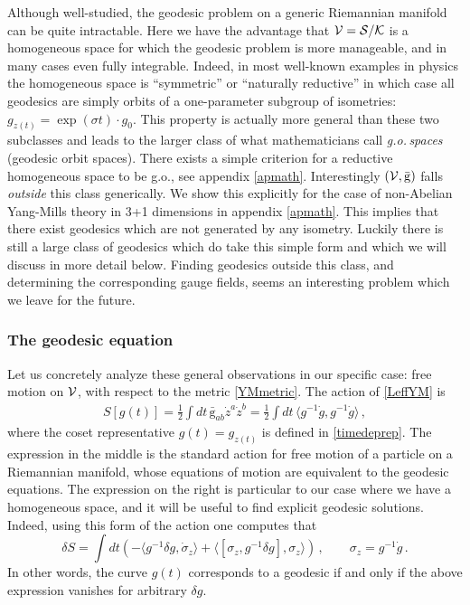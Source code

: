 \documentclass[11pt,a4paper]{article}
\def\calk{{\cal K}}
\def\cals{{\cal S}}
\def\calv{{\cal V}}
\def\rg{{\mathrm{g}}}
\begin{document}
    Although well-studied, the geodesic problem on a generic Riemannian manifold can be quite intractable. Here we have the advantage that $\calv=\cals/\calk$ is a homogeneous space for which the geodesic problem is more manageable, and in many cases even fully integrable. Indeed, in most well-known examples in physics the homogeneous space is ``symmetric'' or ``naturally reductive'' in which case all geodesics are simply orbits of a one-parameter subgroup of isometries: $g_{z(t)}=\exp(\sigma t)\cdot g_0$. This property is actually more general than these two subclasses and leads to the larger class of what mathematicians call {\it g.o.\,spaces} (geodesic orbit spaces). %
    There exists a simple criterion for a reductive homogeneous space to be g.o., see appendix \ref{apmath}. Interestingly $(\calv,\bar{\rg})$ falls {\it outside} this class generically. We show this explicitly for the case of non-Abelian Yang-Mills theory in 3+1 dimensions in appendix \ref{apmath}. This implies that there exist geodesics which are not generated by any isometry. Luckily there is still a large class of geodesics which do take this simple form and which we will discuss in more detail below. Finding geodesics outside this class, and determining the corresponding gauge fields, seems an interesting problem which we leave for the future.
    \subsubsection{The geodesic equation}
    Let us concretely analyze these general observations in our specific case: free motion on $\calv$, with respect to the metric \eqref{YMmetric}. The action of \eqref{LeffYM} is
    \begin{align}
    S[g(t)]=\frac{1}{2} \int dt\,\bar\rg_{ab}\dot z^a\dot z^b=\frac{1}{2} \int dt\,\langle g^{-1}\dot g,g^{-1}\dot g\rangle\label{startphys}\,,
    \end{align}
    where the coset representative $g(t)=g_{z(t)}$ is defined in \eqref{timedeprep}. The expression in the middle is the standard action for free motion of a particle on a Riemannian manifold, whose equations of motion are equivalent to the geodesic equations. The expression on the right is particular to our case where we have a homogeneous space, and it will be useful to find explicit geodesic solutions. Indeed, using this form of the action one computes that
    \begin{equation}\label{geoeq}
    \delta S=\int dt\left( -\langle g^{-1}\delta g,\dot{\sigma}_z\rangle+\langle[\sigma_z,
    g^{-1}\delta g], \sigma_z\rangle\right)\,,\qquad \sigma_z=g^{-1}\dot g\,.
    \end{equation}
    In other words, the curve $g(t)$ corresponds to a geodesic if and only if the above expression vanishes for arbitrary $\delta g$.
    
\end{document}
